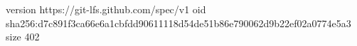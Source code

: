 version https://git-lfs.github.com/spec/v1
oid sha256:d7c891f3ca66e6a1cbfdd90611118d54de51b86e790062d9b22ef02a0774e5a3
size 402
